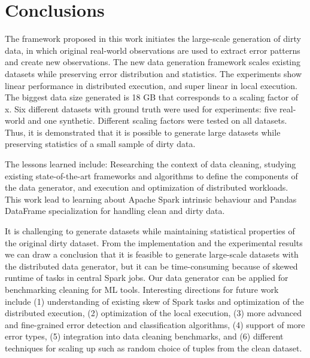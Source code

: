 \chapter{Conclusions}
The framework proposed in this work initiates the large-scale generation of dirty data, in which original real-world observations are used to extract error patterns and create new observations.
The new data generation framework scales existing datasets while preserving error distribution and statistics.
The experiments show linear performance in distributed execution, and super linear in local execution.
The biggest data size generated is 18 GB that corresponds to a scaling factor of x.
Six different datasets with ground truth were used for experiments: five real-world and one synthetic.
Different scaling factors were tested on all datasets.
Thus, it is demonstrated that it is possible to generate large datasets while preserving statistics of a small sample of dirty data.

The lessons learned include: Researching the context of data cleaning, studying existing state-of-the-art frameworks and algorithms to define the components of the data generator, and execution and optimization of distributed workloads.
This work lead to learning about Apache Spark intrinsic behaviour and Pandas DataFrame specialization for handling clean and  dirty data.

It is challenging to generate datasets while maintaining statistical properties of the original dirty dataset.
From the implementation and the experimental results we can draw a conclusion that it is feasible to generate large-scale datasets with the distributed data generator, but it can be time-consuming because of skewed runtime of tasks in central Spark jobs.
Our data generator can be applied for benchmarking cleaning for ML tools.
Interesting directions for future work include 
(1) understanding of existing skew of Spark tasks and optimization of the distributed execution,
(2) optimization of the local execution, 
(3) more advanced and fine-grained error detection and classification algorithms,
(4) support of more error types, 
(5) integration into data cleaning benchmarks, and
(6) different techniques for scaling up such as random choice of tuples from the clean dataset.
 

